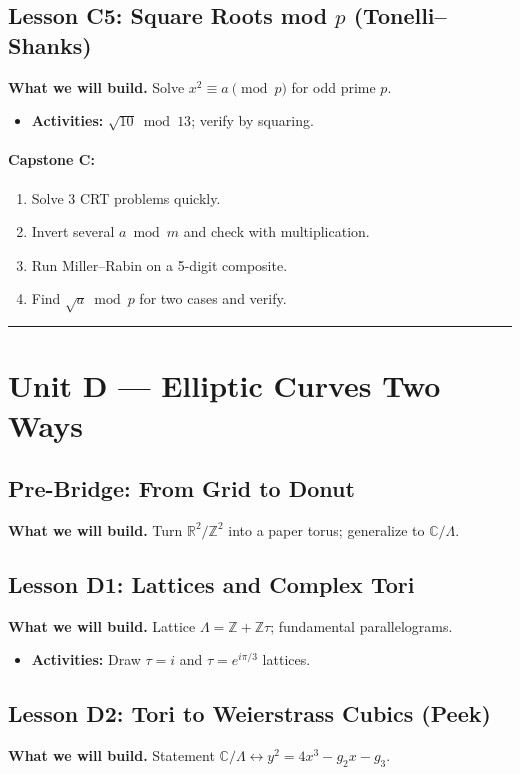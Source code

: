 \documentclass[11pt]{article}
\begin{document}
\subsection*{Lesson C5: Square Roots mod $p$ (Tonelli--Shanks)}
\textbf{What we will build.} Solve $x^2\equiv a\pmod{p}$ for odd prime $p$.
\begin{itemize}
\item \textbf{Activities:} $\sqrt{10}\bmod 13$; verify by squaring.
\end{itemize}

\paragraph{Capstone C:}
\begin{enumerate}
\item Solve 3 CRT problems quickly.
\item Invert several $a\bmod m$ and check with multiplication.
\item Run Miller--Rabin on a 5-digit composite.
\item Find $\sqrt{a}\bmod p$ for two cases and verify.
\end{enumerate}

\bigskip
\hrule
\bigskip

\section*{Unit D --- Elliptic Curves Two Ways}
\subsection*{Pre-Bridge: From Grid to Donut}
\textbf{What we will build.} Turn $\mathbb{R}^2/\mathbb{Z}^2$ into a paper torus; generalize to $\mathbb{C}/\Lambda$.

\subsection*{Lesson D1: Lattices and Complex Tori}
\textbf{What we will build.} Lattice $\Lambda=\mathbb{Z}+\mathbb{Z}\tau$; fundamental parallelograms.
\begin{itemize}
\item \textbf{Activities:} Draw $\tau=i$ and $\tau=e^{i\pi/3}$ lattices.
\end{itemize}

\subsection*{Lesson D2: Tori to Weierstrass Cubics (Peek)}
\textbf{What we will build.} Statement $\mathbb{C}/\Lambda\leftrightarrow y^2=4x^3-g_2x-g_3$.
\end{document}
